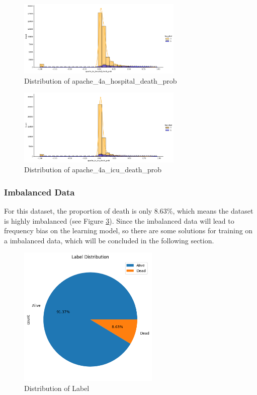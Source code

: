\documentclass[a4paper, oneside, final, 12pt]{scrartcl} %
\begin{document}
\begin{figure}[h]
  \centering
  \includegraphics[width=0.7\textwidth]{"./image/dataset/hospital_death_prob_dis.png"}
  \caption{Distribution of apache\_4a\_hospital\_death\_prob}
  \label{fig:apache_4a_hospital_death_prob}
\end{figure}

\begin{figure}[h]
  \centering
  \includegraphics[width=0.7\textwidth]{"./image/dataset/icu_death_prob_dis.png"}
  \caption{Distribution of apache\_4a\_icu\_death\_prob}
  \label{fig:apache_4a_icu_death_prob}
\end{figure}

\subsubsection{Imbalanced Data}

For this dataset, the proportion of death is only 8.63\%, 
which means the dataset is highly imbalanced (see Figure \ref{fig:label_dis}).
Since the imbalanced data will lead to frequency bias on the learning model,
so there are some solutions for training on a imbalanced data,
which will be concluded in the following section.

\begin{figure}[h]
  \centering
  \includegraphics[width=0.6\textwidth]{"./image/dataset/alive_dead_dis.png"}
  \caption{Distribution of Label}
  \label{fig:label_dis}
\end{figure}
\end{document}
